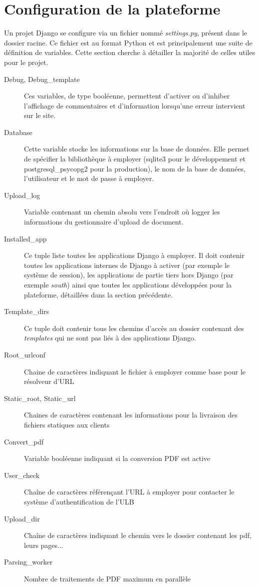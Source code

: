 \documentclass[a4paper,12pt]{article}
\begin{document}
\section{Configuration de la plateforme}

Un projet Django se configure via un fichier nommé \textit{settings.py},
présent dans le dossier racine. Ce fichier est au format Python et est principalement
une suite de définition de variables. Cette section cherche à détailler la majorité
de celles utiles pour le projet.

\begin{description}
\item[Debug, Debug\_template] Ces variables, de type booléenne, permettent d'activer
      ou d'inhiber l'affichage de commentaires et d'information lorsqu'une erreur
      intervient sur le site.
\item[Database] Cette variable stocke les informations sur la base de données. Elle
      permet de spécifier la bibliothèque à employer (sqlite3 pour le développement
      et postgresql\_psycopg2 pour la production), le nom de la base de données, l'utilisateur
      et le mot de passe à employer.
\item[Upload\_log] Variable contenant un chemin absolu vers l'endroit où logger
      les informations du gestionnaire d'upload de document.
\item[Installed\_app] Ce tuple liste toutes les applications Django à employer. Il
      doit contenir toutes les applications internes de Django à activer (par exemple
      le système de session), les applications de partie tiers hors Django (par exemple
      \textit{south}) ainsi que toutes les applications développées pour la plateforme,
      détaillées dans la section précédente.
\item[Template\_dirs] Ce tuple doit contenir tous les chemins d'accès au dossier
      contenant des \textit{templates} qui ne sont pas liés à des applications Django.
\item[Root\_urlconf] Chaine de caractères indiquant le fichier à employer comme
      base pour le résolveur d'URL
\item[Static\_root, Static\_url] Chaines de caractères contenant les informations
      pour la livraison des fichiers statiques aux clients
\item[Convert\_pdf] Variable booléenne indiquant si la conversion PDF est active
\item[User\_check] Chaîne de caractères référençant l'URL à employer pour contacter
      le système d'authentification de l'ULB
\item[Upload\_dir] Chaîne de caractères indiquant le chemin vers le dossier contenant
      les pdf, leurs pages...
\item[Parsing\_worker] Nombre de traitements de PDF maximum en parallèle
\end{description}
\end{document}
